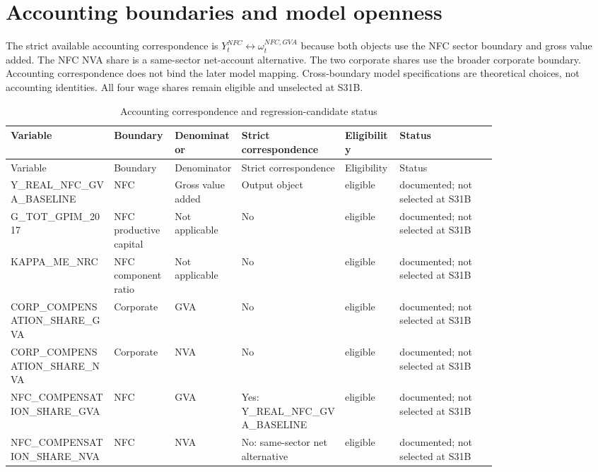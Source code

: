 \documentclass[11pt]{article}
\begin{document}
\section{Accounting boundaries and model openness}
The strict available accounting correspondence is $Y_t^{NFC}\leftrightarrow\omega_t^{NFC,GVA}$ because both objects use the NFC sector boundary and gross value added. The NFC NVA share is a same-sector net-account alternative. The two corporate shares use the broader corporate boundary.
Accounting correspondence does not bind the later model mapping. Cross-boundary model specifications are theoretical choices, not accounting identities. All four wage shares remain eligible and unselected at S31B.
\setcounter{table}{5}
\begin{landscape}
\begin{center}
\tiny
\begin{longtable}{p{0.17\linewidth}p{0.10\linewidth}p{0.11\linewidth}p{0.17\linewidth}p{0.09\linewidth}p{0.16\linewidth}}
\caption{Accounting correspondence and regression-candidate status}\label{tab:accounting}\\
\toprule
Variable & Boundary & Denominator & Strict correspondence & Eligibility & Status \\
\midrule
\endfirsthead
\toprule
Variable & Boundary & Denominator & Strict correspondence & Eligibility & Status \\
\midrule
\endhead
Y\_\allowbreak{}REAL\_\allowbreak{}NFC\_\allowbreak{}GVA\_\allowbreak{}BASELINE & NFC & Gross value added & Output object & eligible & documented; not selected at S31B \\
G\_\allowbreak{}TOT\_\allowbreak{}GPIM\_\allowbreak{}2017 & NFC productive capital & Not applicable & No & eligible & documented; not selected at S31B \\
KAPPA\_\allowbreak{}ME\_\allowbreak{}NRC & NFC component ratio & Not applicable & No & eligible & documented; not selected at S31B \\
CORP\_\allowbreak{}COMPENSATION\_\allowbreak{}SHARE\_\allowbreak{}GVA & Corporate & GVA & No & eligible & documented; not selected at S31B \\
CORP\_\allowbreak{}COMPENSATION\_\allowbreak{}SHARE\_\allowbreak{}NVA & Corporate & NVA & No & eligible & documented; not selected at S31B \\
NFC\_\allowbreak{}COMPENSATION\_\allowbreak{}SHARE\_\allowbreak{}GVA & NFC & GVA & Yes: Y\_\allowbreak{}REAL\_\allowbreak{}NFC\_\allowbreak{}GVA\_\allowbreak{}BASELINE & eligible & documented; not selected at S31B \\
NFC\_\allowbreak{}COMPENSATION\_\allowbreak{}SHARE\_\allowbreak{}NVA & NFC & NVA & No: same-sector net alternative & eligible & documented; not selected at S31B \\
\bottomrule
\end{longtable}
\normalsize
\end{center}
\end{landscape}
\end{document}
